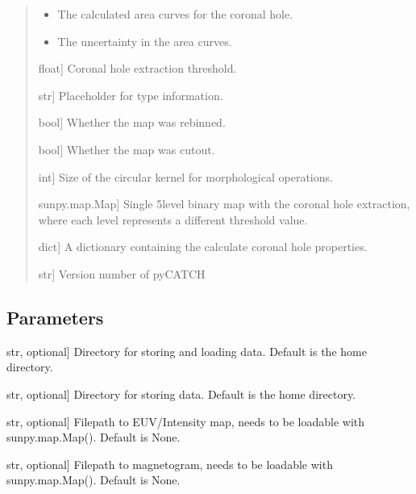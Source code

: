 \documentclass[letterpaper,10pt,english]{sphinxmanual}
\begin{document}
\begin{fulllineitems}
\begin{quote}
\begin{description}
\begin{itemize}
\item {} 
\sphinxAtStartPar
The calculated area curves for the coronal hole.

\item {} 
\sphinxAtStartPar
The uncertainty in the area curves.

\end{itemize}

\sphinxlineitem{threshold}{[}float{]}
\sphinxAtStartPar
Coronal hole extraction threshold.

\sphinxlineitem{type}{[}str{]}
\sphinxAtStartPar
Placeholder for type information.

\sphinxlineitem{rebin\_status}{[}bool{]}
\sphinxAtStartPar
Whether the map was rebinned.

\sphinxlineitem{cutout\_status}{[}bool{]}
\sphinxAtStartPar
Whether the map was cutout.

\sphinxlineitem{kernel}{[}int{]}
\sphinxAtStartPar
Size of the circular kernel for morphological operations.

\sphinxlineitem{binmap}{[}sunpy.map.Map{]}
\sphinxAtStartPar
Single 5\sphinxhyphen{}level binary map with the coronal hole extraction, where each level represents a different threshold value.

\sphinxlineitem{properties}{[}dict{]}
\sphinxAtStartPar
A dictionary containing the calculate coronal hole properties.

\sphinxlineitem{\_\_version\_\_}{[}str{]}
\sphinxAtStartPar
Version number of pyCATCH

\end{description}
\end{quote}


\subsection{Parameters}
\label{\detokenize{pycatch/pycatch:parameters}}\begin{description}
\sphinxlineitem{dir}{[}str, optional{]}
\sphinxAtStartPar
Directory for storing and loading data. Default is the home directory.

\sphinxlineitem{save\_dir}{[}str, optional{]}
\sphinxAtStartPar
Directory for storing data. Default is the home directory.

\sphinxlineitem{map\_file}{[}str, optional{]}
\sphinxAtStartPar
Filepath to EUV/Intensity map, needs to be loadable with sunpy.map.Map(). Default is None.

\sphinxlineitem{magnetogram\_file}{[}str, optional{]}
\sphinxAtStartPar
Filepath to magnetogram, needs to be loadable with sunpy.map.Map(). Default is None.


\end{description}
\end{fulllineitems}
\end{document}
